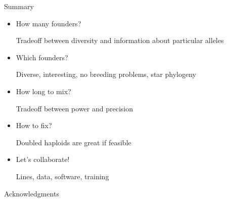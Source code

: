 \documentclass[12pt]{article}
\newcommand{\headsize}{\fontsize{35}{35} \selectfont}
\newcommand{\smallsize}{\fontsize{25}{30} \selectfont}
\newcommand{\smallersize}{\fontsize{20}{25} \selectfont}
\begin{document}
{\newpage

\addtocounter{page}{-1}

\headsize \color{myyellow}
\hfill \begin{minipage}{5.75in}
\centering
Summary
\end{minipage}

\vspace{15mm}

\color{mywhite}
\smallsize

\hfill \begin{minipage}{10in}
\begin{itemize}
\itemsep24pt
\item How many founders?

{\smallersize \color{myblue} Tradeoff between {\color{mypink} diversity} and information about
  {\color{mypink} particular alleles}}

\item Which founders?

{\smallersize \color{myblue} Diverse, interesting, no breeding
  problems, star phylogeny}

\item How long to mix?

{\smallersize \color{myblue} Tradeoff between {\color{mypink} power}
  and {\color{mypink} precision}}

\item How to fix?

{\smallersize \color{myblue} Doubled haploids are great if feasible}

\item Let's {\color{mypink} collaborate}!

{\smallersize \color{myblue} Lines, data, software, training}


\end{itemize}
\end{minipage}



\newpage


\headsize \color{myyellow}
\hfill \begin{minipage}{5.75in}
\centering
Acknowledgments
\end{minipage}

\vspace{20mm} \color{mywhite} \smallersize

\hfill \begin{minipage}{9in}


\end{minipage}}
\end{document}
